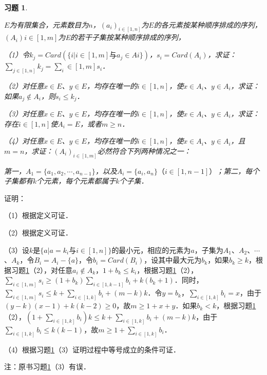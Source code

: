 \documentclass[12pt, a4paper, oneside]{book}
\newtheorem{exer}{习题}
\begin{document}
			\begin{exer}\label{exer151}
				\hfill\par
				$E$为有限集合，元素数目为$n$，$(a_i)_{i\in [1, n]}$为$E$的各元素按某种顺序排成的序列，$(A_i)i\in [1, m]$为E的若干子集按某种顺序排成的序列，
				\par
				（1）令$k_j=Card(\{i|i\in [1, m]\text{与}a_j\in Ai\})$，$s_i=Card(A_i)$，求证：$\sum\limits_{j\in [1, n]}k_j=\sum\limits_i\in [1, m]s_i$．
				\par
				（2）对任意$x\in E$、$y\in E$，均存在唯一的$i\in [1, n]$，使$x\in A_i$、$y\in A_i$，求证：如果$a_j\notin A_i$，则$s_i\leq k_j$．
				\par
				（3）对任意$x\in E$、$y\in E$，均存在唯一的$i\in [1, n]$，使$x\in A_i$、$y\in A_i$，求证：存在$i\in [1, n]$使$A_i=E$，或者$m\geq n$．
				\par
				（4）对任意$x\in E$、$y\in E$，均存在唯一的$i\in [1, n]$，使$x\in A_i$、$y\in A_i$，且$m=n$，求证：$(A_i)_{i\in [1, m]}$必然符合下列两种情况之一：
				\par
				第一，$A_1=\{a_1, a_2, \cdots, a_{n-1}\}$，以及$A_i=\{a_i, a_n\}（i\in [1, n-1]）$；第二，每个子集都有$k$个元素，每个元素都属于$k$个子集．
			\end{exer}
			证明：
			\par
			（1）根据定义可证．
			\par
			（2）根据定义可证．
			\par
			（3）设$k$是$\{a|a=k_i\text{与}i\in [1, n]\}$的最小元，相应的元素为$a$，子集为$A_1$、$A_2$、$\cdots$、$A_k$，令$B_i=A_i-\{a\}$，令$b_i=Card(B_i)$，设其中最大元为$b_k$，如果$b_k\geq k$，根据习题\ref{exer151}（2），对任意$a_i\notin A_k$，$1+b_k\leq k_i$，根据习题\ref{exer151}（2），$\sum\limits_{i\in [1, m]}s_i\geq (1+b_k)\sum\limits_{i\in [1, k-1]}b_i+k(b_k+1)$．同时，$\sum\limits_{i\in [1, m]}s_i\leq k+\sum\limits_{i\in [1, k]}b_i+(m-k)k$．令$y=b_k$，$\sum\limits_{i\in [1, k]}b_i=x$，由于$(y-k)(x-1)+k(k-2)\geq 0$，故$m\geq 1+x+y$．如果$b_k<k$，根据习题\ref{exer151}（2），$(1+\sum\limits_{i\in [1, k]}b_i)k\leq k+\sum\limits_{i\in [1, k]}b_i+(m-k)k$，由于$\sum\limits_{i\in [1, k]}b_i\leq k(k-1)$，故$m\geq 1+\sum\limits_{i\in [1, k]}b_i$．
			\par
			（4）根据习题\ref{exer151}（3）证明过程中等号成立的条件可证．
			\par
			注：原书习题\ref{exer151}（3）有误．
			
\end{document}
